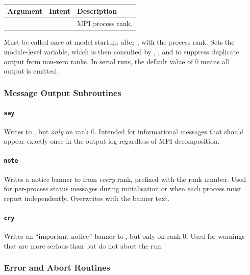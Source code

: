 \begin{longtable}{L{3cm} L{3cm} L{8cm}}
  \toprule
  \textbf{Argument} & \textbf{Intent} & \textbf{Description} \\
  \midrule
  \endhead
  \bottomrule
  \endfoot
   &  & MPI process rank. \\
\end{longtable}

Must be called once at model startup, after , with the
process rank. Sets the module-level  variable, which is then
consulted by , , and  to suppress duplicate
output from non-zero ranks. In serial runs, the default value of 0 means
all output is emitted.

\subsubsection{Message Output Subroutines}

\paragraph{\texttt{say}}

Writes  to , but \emph{only} on rank 0.
Intended for informational messages that should appear exactly once in the
output log regardless of MPI decomposition.

\paragraph{\texttt{note}}

Writes a notice banner to  from \emph{every} rank, prefixed
with the rank number. Used for per-process status messages during
initialisation or when each process must report independently.
Overwrites  with the banner text.

\paragraph{\texttt{cry}}

Writes an ``important notice'' banner to , but only on rank 0.
Used for warnings that are more serious than  but do not abort the
run.

\subsubsection{Error and Abort Routines}

